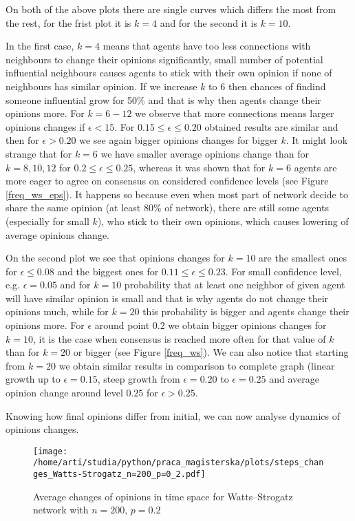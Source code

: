 \documentclass{article}
\begin{document}
On both of the above plots there are single curves which differs the most from the rest, for the frist plot it is $k=4$ and for the second it is $k=10$. 
\indent

In the first case, $k=4$ means that agents have too less connections with neighbours to change their opinions significantly, small number of potential influential neighbours causes agents to stick with their own opinion if none of neighbours has similar opinion. If we increase $k$ to $6$ then chances of findind someone influential grow for 50\% and that is why then agents change their opinions more. For $k=6-12$ we observe that more connections means larger opinions changes if $\epsilon < 15$. For $0.15 \leq \epsilon \leq 0.20$ obtained results are similar and then for $\epsilon > 0.20$ we see again   bigger opinions changes for bigger $k$. It might look strange that for $k=6$ we have smaller average opinions change than for $k=8, 10, 12$ for $0.2 \leq \epsilon \leq 0.25$, whereas it was shown that for $k=6$ agents are more eager to agree on consensus on considered confidence levels (see Figure \ref{freq_ws_eps}). It happens so because even when most part of network decide to share the same opinion (at least 80\% of network), there are still some agents (especially for small $k$), who stick to their own opinions, which causes lowering of average opinions change.
\indent

On the second plot we see that opinions changes for $k=10$ are the smallest ones for $\epsilon \leq 0.08$ and the biggest ones for $0.11 \leq \epsilon \leq 0.23$. For small confidence level, e.g. $\epsilon=0.05$ and for $k=10$ probability that at least one neighbor of given agent will have similar opinion is small and that is why agents do not change their opinions much, while for $k=20$ this probability is bigger and agents change their opinions more. For $\epsilon$ around point $0.2$ we obtain bigger opinions changes for $k=10$, it is the case when consensus is reached more often for that value of $k$ than for $k=20$ or bigger (see Figure \ref{freq_ws}). We can also notice that starting from $k=20$ we obtain similar results in comparison to complete graph (linear growth up to $\epsilon=0.15$, steep growth from $\epsilon=0.20$ to $\epsilon=0.25$ and average opinion change around level $0.25$ for $\epsilon>0.25$.

\indent

Knowing how final opinions differ from initial, we can now analyse dynamics of opinions changes.

\begin{figure}[H]
		\centering
		\texttt{[image: /home/arti/studia/python/praca\_magisterska/plots/steps\_changes\_Watts-Strogatz\_n=200\_p=0\_2.pdf]}
		\caption{Average changes of opinions in time space for Watts--Strogatz network with $n=200$, $p=0.2$}
\end{figure}
\end{document}
